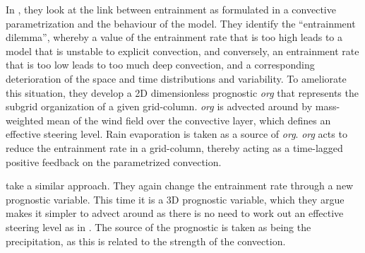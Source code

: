 \documentclass[11pt,a4paper]{article}
\newcommand\todo[1]{\textbf{TODO: #1}}
\begin{document}


In \cite{mapes2011parameterizing}, they look at the link between entrainment as formulated in a convective parametrization and the behaviour of the model. They identify the ``entrainment dilemma'', whereby a value of the entrainment rate that is too high leads to a model that is unstable to explicit convection, and conversely, an entrainment rate that is too low leads to too much deep convection, and a corresponding deterioration of the space and time distributions and variability. To ameliorate this situation, they develop a 2D dimensionless prognostic \textit{org} that represents the subgrid organization of a given grid-column. \textit{org} is advected around by mass-weighted mean of the wind field over the convective layer, which defines an effective steering level. Rain evaporation is taken as a source of \textit{org}. \textit{org} acts to reduce the entrainment rate in a grid-column, thereby acting as a time-lagged positive feedback on the parametrized convection. 

\cite{willett2017simple} take a similar approach. They again change the entrainment rate through a new prognostic variable. This time it is a 3D prognostic variable, which they argue makes it simpler to advect around as there is no need to work out an effective steering level as in \cite{mapes2011parameterizing}. The source of the prognostic is taken as being the precipitation, as this is related to the strength of the convection.

\end{document}
